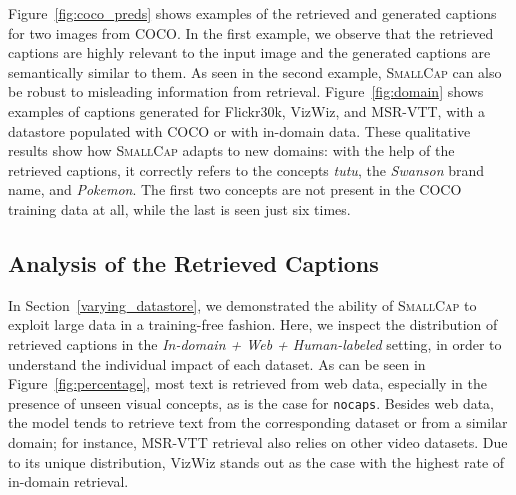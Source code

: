 \documentclass[10pt,twocolumn,letterpaper]{article}
\newcommand{\model}{\textsc{SmallCap}\xspace}
\begin{document}
Figure~\ref{fig:coco_preds} shows examples of the retrieved and generated captions for two images from COCO. In the first example, we observe that the retrieved captions are highly relevant to the input image and the generated captions are semantically similar to them. As seen in the second example, \textsc{SmallCap} can also be robust to misleading information from retrieval. %
Figure~\ref{fig:domain} shows examples of captions generated for Flickr30k, VizWiz, and MSR-VTT, with a datastore populated with COCO or with in-domain data. These qualitative results show how \model adapts to new domains: %
with the help of the retrieved captions, it correctly refers to the  concepts \textit{tutu}, the \textit{Swanson} brand name, and \textit{Pokemon}. The first two concepts are not present in the COCO training data at all, while the last is seen just six times.







%


\subsection{Analysis of the Retrieved Captions}

In Section~\ref{varying_datastore}, we demonstrated the ability of \model to exploit large data in a training-free fashion. Here, we inspect the distribution of retrieved captions in the \textit{In-domain + Web + Human-labeled} setting, in order to understand the individual impact of each dataset. As can be seen in Figure~\ref{fig:percentage}, most text is retrieved from web data, especially in the presence of unseen visual concepts, as is the case for \texttt{nocaps}. 
Besides web data, the model tends to retrieve text from the corresponding dataset or from a similar domain; for instance, MSR-VTT retrieval also relies on other video datasets. Due to its unique distribution, VizWiz stands out as the case with the highest rate of in-domain retrieval.
\end{document}
